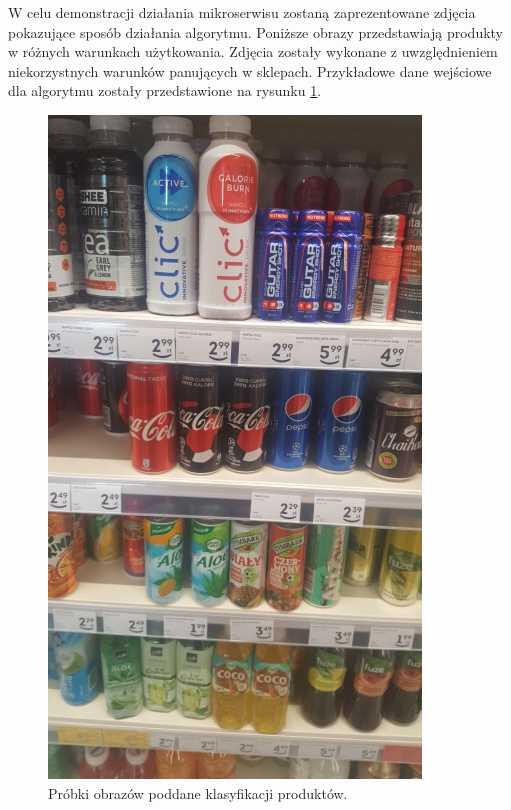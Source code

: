 {{W celu demonstracji działania mikroserwisu zostaną zaprezentowane zdjęcia pokazujące sposób działania algorytmu. Poniższe obrazy przedstawiają produkty w różnych warunkach użytkowania. Zdjęcia zostały wykonane z uwzględnieniem niekorzystnych warunków panujących w sklepach. Przykładowe dane wejściowe dla algorytmu zostały przedstawione na rysunku \ref{beforeClasification}.

\begin{figure}[htb]
	\caption{Próbki obrazów poddane klasyfikacji produktów.}
	\label{beforeClasification}
	\noindent\begin{minipage}
		{0.43\textwidth}\raggedleft		\includegraphics[width=\linewidth]{"images/detection_sample"}

\end{minipage}
\end{figure}}}
